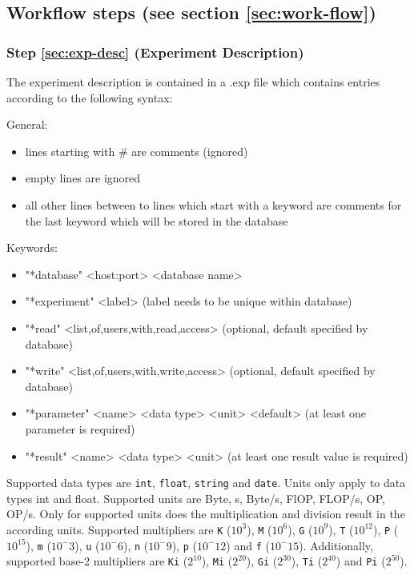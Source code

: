 \documentclass[12pt,a4paper]{article}
\begin{document}
\subsection{Workflow steps (see section \ref{sec:work-flow})}
\subsubsection{Step \ref{sec:exp-desc} (Experiment Description)}
   The experiment description is contained in a .exp file which contains 
   entries according to the following syntax:

   General:
   \begin{itemize}
   \item lines starting with \# are comments (ignored)
   \item empty lines are ignored
   \item all other lines between to lines which start with a keyword are comments
     for the last keyword which will be stored in the database
   \end{itemize}

   Keywords:
   \begin{itemize}
   \item "*database" <host:port> <database name>
   \item "*experiment" <label>   
     (label needs to be unique within database)
   \item "*read" <list,of,users,with,read,access> 
     (optional, default specified by database)
   \item "*write" <list,of,users,with,write,access> 
     (optional, default specified by database)
   \item "*parameter" <name> <data type> <unit> <default> 
     (at least one parameter is required)
   \item "*result" <name> <data type> <unit>
     (at least one result value is required)
   \end{itemize}

   Supported data types are \texttt{int}, \texttt{float}, \texttt{string} and \texttt{date}.
   Units only apply to data types int and float. Supported units are Byte, s,
   Byte/s, FlOP, FLOP/s, OP, OP/s. Only for supported units does the multiplication
   and division result in the according units. Supported multipliers are \texttt{K} ($10^3$), 
   \texttt{M} ($10^6$), \texttt{G} ($10^9$), \texttt{T} ($10^12$), \texttt{P} ($10^15$), \texttt{m} ($10^-3$), \texttt{u} ($10^-6$),
   \texttt{n} ($10^-9$), \texttt{p} ($10^-12$) and \texttt{f} ($10^-15$). Additionally, supported base-2 
   multipliers are \texttt{Ki} ($2^10$), \texttt{Mi} ($2^20$), \texttt{Gi} ($2^30$), \texttt{Ti} ($2^40$) and
   \texttt{Pi} ($2^50$). 
\end{document}
